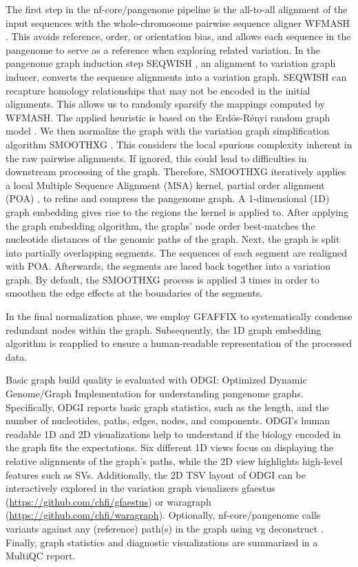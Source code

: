 \documentclass{bioinfo}
\theoremstyle{definition}
\begin{document}
	The first step in the nf-core/pangenome pipeline is the all-to-all alignment of the input sequences with the whole-chromosome pairwise sequence aligner WFMASH \citep{wfmash}. 
	This avoids reference, order, or orientation bias, and allows each sequence in the pangenome to serve as a reference when exploring related variation. 
	In the pangenome graph induction step SEQWISH \citep{Garrison2022}, an alignment to variation graph inducer, converts the sequence alignments into a variation graph. SEQWISH can recapture homology relationships that may not be encoded in the initial alignments. 
	This allows us to randomly sparsify the mappings computed by WFMASH. 
	The applied heuristic is based on the Erdös-Rényi random graph model \citep{Bollobs2001}. 
	We then normalize the graph with the variation graph simplification algorithm SMOOTHXG \citep{Garrison2023}.
	This considers the local spurious complexity inherent in the raw pairwise alignments. 
	If ignored, this could lead to difficulties in downstream processing of the graph.
	Therefore, SMOOTHXG iteratively applies a local Multiple Sequence Alignment (MSA) kernel, partial order alignment (POA) \citep{Lee2002}, to refine and compress the pangenome graph. A 1-dimensional (1D) graph embedding \citep{Heumos2023} gives rise to the regions the kernel is applied to. 
	After applying the graph embedding algorithm, the graphs’ node order best-matches the nucleotide distances of the genomic paths of the graph. 
	Next, the graph is split into partially overlapping segments. 
	The sequences of each segment are realigned with POA. Afterwards, the segments are laced back together into a variation graph. 
	By default, the SMOOTHXG process is applied 3 times in order to smoothen the edge effects at the boundaries of the segments.
	
	In the final normalization phase, we employ GFAFFIX \citep{Liao2023} to systematically condense redundant nodes within the graph. 
	Subsequently, the 1D graph embedding algorithm is reapplied to ensure a human-readable representation of the processed data. 
	
	Basic graph build quality is evaluated with ODGI: Optimized Dynamic Genome/Graph Implementation \citep{Guarracino2022} for understanding pangenome graphs. Specifically, ODGI reports basic graph statistics, such as the length, and the number of nucleotides, paths, edges, nodes, and components. ODGI’s human readable 1D and 2D visualizations help to understand if the biology encoded in the graph fits the expectations. 
	Six different 1D views focus on displaying the relative alignments of the graph’s paths, while the 2D view highlights high-level features such as SVs. 
	Additionally, the 2D TSV layout of ODGI can be interactively explored in the variation graph visualizers gfaestus (\url{https://github.com/chfi/gfaestus}) or waragraph (\url{https://github.com/chfi/waragraph}). 
	Optionally, nf-core/pangenome calls variants against any (reference) path(s) in the graph using vg deconstruct \citep{Garrison:2018}. 
	Finally, graph statistics and diagnostic visualizations are summarized in a MultiQC \citep{Ewels_2016} report.
	
\end{document}

